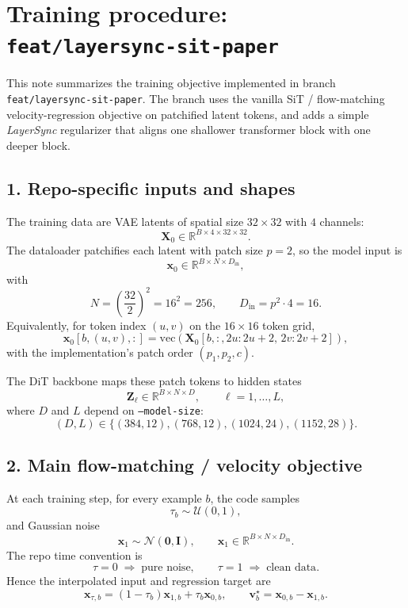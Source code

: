 \documentclass[11pt]{article}
\begin{document}
\section*{Training procedure: \texttt{feat/layersync-sit-paper}}

This note summarizes the training objective implemented in branch \texttt{feat/layersync-sit-paper}. The branch uses the vanilla SiT / flow-matching velocity-regression objective on patchified latent tokens, and adds a simple \emph{LayerSync} regularizer that aligns one shallower transformer block with one deeper block.

\subsection*{1. Repo-specific inputs and shapes}
The training data are VAE latents of spatial size $32\times 32$ with $4$ channels:
\[
  \bm{X}_0 \in \mathbb{R}^{B\times 4\times 32\times 32}.
\]
The dataloader patchifies each latent with patch size $p=2$, so the model input is
\[
  \bm{x}_0 \in \mathbb{R}^{B\times N\times D_{\mathrm{in}}},
\]
with
\[
  N = \left(\frac{32}{2}\right)^2 = 16^2 = 256,
  \qquad
  D_{\mathrm{in}} = p^2 \cdot 4 = 16.
\]
Equivalently, for token index $(u,v)$ on the $16\times 16$ token grid,
\[
  \bm{x}_0[b,(u,v),:]
  =
  \mathrm{vec}\!\left(\bm{X}_0[b,:,2u:2u+2,\,2v:2v+2]\right),
\]
with the implementation's patch order $(p_1,p_2,c)$.

The DiT backbone maps these patch tokens to hidden states
\[
  \bm{Z}_\ell \in \mathbb{R}^{B\times N\times D},
  \qquad \ell=1,\dots,L,
\]
where $D$ and $L$ depend on \texttt{--model-size}:
\[
  (D,L)\in\{(384,12),(768,12),(1024,24),(1152,28)\}.
\]

\subsection*{2. Main flow-matching / velocity objective}
At each training step, for every example $b$, the code samples
\[
  \tau_b \sim \mathcal{U}(0,1),
\]
and Gaussian noise
\[
  \bm{x}_1 \sim \mathcal{N}(\bm{0},\bm{I}),
  \qquad
  \bm{x}_1 \in \mathbb{R}^{B\times N\times D_{\mathrm{in}}}.
\]
The repo time convention is
\[
  \tau=0 \;\Longrightarrow\; \text{pure noise},
  \qquad
  \tau=1 \;\Longrightarrow\; \text{clean data}.
\]
Hence the interpolated input and regression target are
\[
  \bm{x}_{\tau,b} = (1-\tau_b)\bm{x}_{1,b} + \tau_b \bm{x}_{0,b},
  \qquad
  \bm{v}_b^\star = \bm{x}_{0,b} - \bm{x}_{1,b}.
\]
\end{document}

